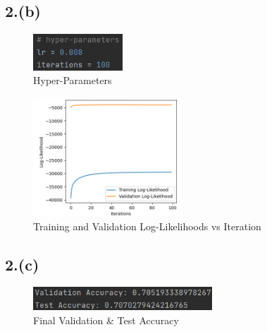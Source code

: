 \documentclass{article}
\begin{document}
\subsection*{2.(b)}

\begin{figure}[H]
    \centering
    \includegraphics[width=0.3\textwidth]{2(b)1.png}
    \caption{Hyper-Parameters}
\end{figure}
\begin{figure}[H]
    \centering
    \includegraphics[width=0.5\textwidth]{2(b)2.png}
    \caption{Training and Validation Log-Likelihoods vs Iteration}
\end{figure}

\subsection*{2.(c)}
\begin{figure}[H]
    \centering
    \includegraphics[width=0.6\textwidth]{2(c).png}
    \caption{Final Validation \& Test Accuracy}
\end{figure}
\end{document}
